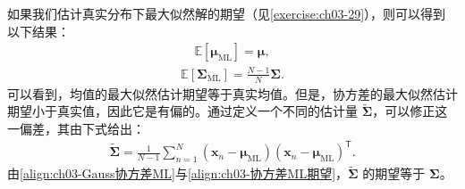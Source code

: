 \documentclass[../../main.tex]{subfiles}
\begin{document}
如果我们估计真实分布下最大似然解的期望（见\cref{exercise:ch03-29}），则可以得到以下结果：
\begin{align}
\mathbb{E}[\boldsymbol{\mu}_{\mathrm{ML}}]=\boldsymbol{\mu},
\label{align:ch03-均值ML期望}
\end{align}
\begin{align}
\mathbb{E}[\boldsymbol{\Sigma}_{\mathrm{ML}}]=\frac{N-1}{N}\boldsymbol{\Sigma}.
\label{align:ch03-协方差ML期望}
\end{align}
可以看到，均值的最大似然估计期望等于真实均值。但是，协方差的最大似然估计期望小于真实值，因此它是有偏的。通过定义一个不同的估计量 $\tilde{\boldsymbol{\Sigma}}$，可以修正这一偏差，其由下式给出：
\begin{align}
\tilde{\boldsymbol{\Sigma}}=\frac{1}{N-1}\sum_{n=1}^{N}(\boldsymbol{x}_n-\boldsymbol{\mu}_{\mathrm{ML}})(\boldsymbol{x}_n-\boldsymbol{\mu}_{\mathrm{ML}})^{\mathsf{T}}.
\label{align:ch03-无偏协方差}
\end{align}
由\eqref{align:ch03-Gauss协方差ML}与\eqref{align:ch03-协方差ML期望}，$\tilde{\boldsymbol{\Sigma}}$ 的期望等于 $\boldsymbol{\Sigma}$。
\end{document}
